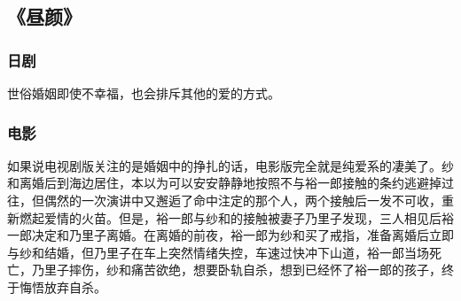 \subsection{《昼颜》}

\subsubsection{日剧}
世俗婚姻即使不幸福，也会排斥其他的爱的方式。

\subsubsection{电影}
如果说电视剧版关注的是婚姻中的挣扎的话，电影版完全就是纯爱系的凄美了。纱和离婚后到海边居住，本以为可以安安静静地按照不与裕一郎接触的条约逃避掉过往，但偶然的一次演讲中又邂逅了命中注定的那个人，两个接触后一发不可收，重新燃起爱情的火苗。但是，裕一郎与纱和的接触被妻子乃里子发现，三人相见后裕一郎决定和乃里子离婚。在离婚的前夜，裕一郎为纱和买了戒指，准备离婚后立即与纱和结婚，但乃里子在车上突然情绪失控，车速过快冲下山道，裕一郎当场死亡，乃里子摔伤，纱和痛苦欲绝，想要卧轨自杀，想到已经怀了裕一郎的孩子，终于悔悟放弃自杀。